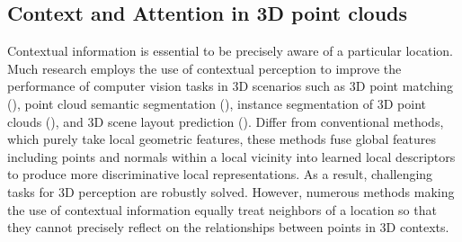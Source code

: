 \subsection{Context and Attention in 3D point clouds}
Contextual information is essential to be precisely aware of a particular location. Much research employs the use of contextual perception to improve the performance of computer vision tasks in 3D scenarios such as 3D point matching (\textcolor{cyan}{\cite{deng2018ppfnet}}), point cloud semantic segmentation (\textcolor{cyan}{\cite{ye20183d}}), instance segmentation of 3D point clouds (\textcolor{cyan}{\cite{hu2018semantic}}), and 3D scene layout prediction (\textcolor{cyan}{\cite{shi2019hierarchy}}). Differ from conventional methods, which purely take local geometric features, these methods fuse global features including points and normals within a local vicinity into learned local descriptors to produce more discriminative local representations. As a result, challenging tasks for 3D perception are robustly solved. However, numerous methods making the use of contextual information equally treat neighbors of a location so that they cannot precisely reflect on the relationships between points in 3D contexts.

